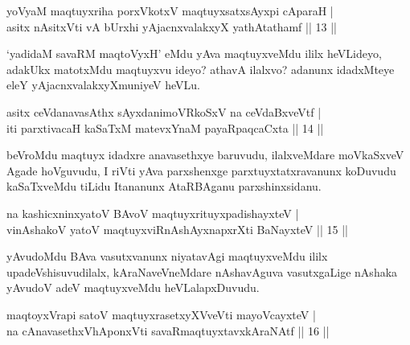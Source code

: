 \begin{shl}
yoV\s yaM maqtuyxriha porxVkotxV maqtuyxsatxsAyxpi cAparaH |\\
asitx nAsitxVti vA bUrxhi yAjacnxvalakxyX yathAtathamf \hfill || 13 ||
\end{shl}

\begin{artha}
`yadidaM savaRM maqtoVyxH' eMdu yAva maqtuyxveMdu ililx heVLideyo, adakUkx matotxMdu maqtuyxvu ideyo? athavA ilalxvo? adanunx idadxMteye eleY yAjacnxvalakxyXmuniyeV heVLu.
\end{artha}

\begin{shl}
asitx ceVdanavasAthx sAyxdanimoVRkoSxV na ceVdaBxveVtf |\\
iti parxtivacaH kaSaTxM matevxYnaM payaRpaqcaCxta \hfill || 14 ||
\end{shl}

\begin{artha}
beVroMdu maqtuyx idadxre anavasethxye baruvudu, ilalxveMdare moVkaSxveV Agade hoVguvudu, I riVti yAva parxshenxge parxtuyxtatxravanunx koDuvudu kaSaTxveMdu tiLidu Itananunx AtaRBAganu parxshinxsidanu.
\end{artha}




\begin{shl}
na kashicxninxyatoV BAvoV maqtuyxrituyxpadishayxteV |\\
vinAshakoV yatoV maqtuyxviRnAshAyxnapxrXti BaNayxteV \hfill || 15 ||
\end{shl}

\begin{artha}
yAvudoMdu BAva vasutxvanunx niyatavAgi maqtuyxveMdu ililx upadeVshisuvudilalx, 
kAraNaveVneMdare nAshavAguva vasutxgaLige nAshaka yAvudoV adeV maqtuyxveMdu heVLalapxDuvudu.
\end{artha}


\begin{shl}
maqtoyxVrapi satoV maqtuyxrasetxyXVveVti mayoVcayxteV |\\
na cAnavasethxVhA\s \s ponxVti savaRmaqtuyxtavxkAraNAtf \hfill || 16 ||
\end{shl}

